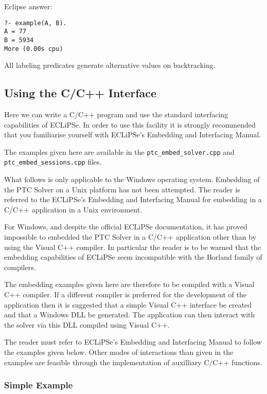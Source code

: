 \documentclass{article}
\begin{document}
Eclipse answer:

\begin{verbatim}
?- example(A, B).
A = 77
B = 5934
More (0.00s cpu)
\end{verbatim}

All labeling predicates generate alternative values on
backtracking.

\subsection{Using the C/C++ Interface}

Here we can write a C/C++ program and use the standard interfacing capabilities
of ECLiPSe.
In order to use this facility it is strongly recommended that you familiarise
yourself
with ECLiPSe's Embedding and Interfacing Manual.

The examples given here are available in the \verb+ptc_embed_solver.cpp+ and
\verb+ptc_embed_sessions.cpp+ files.

What follows is only applicable to the Windows operating system. Embedding of
the PTC Solver on a Unix platform has not been attempted. The reader is referred
to the ECLiPSe's Embedding and Interfacing Manual for embedding in a C/C++
application in a Unix environment.

For Windows, and despite the official ECLiPSe documentation, it has proved
impossible to embedded the PTC Solver in a C/C++ application other than by using
the Visual C++ compiler. In particular the reader is to be warned that the
embedding capabilities of ECLiPSe seem incompatible with the Borland family of
compilers.

The embedding examples given here are therefore to be compiled with a Visual C++
compiler. If a different compiler is preferred for the development of the
application then it is suggested that a simple Visual C++ interface be created
and
that a Windows DLL be generated. The application can then interact with the
solver via this DLL compiled using Visual C++.

The reader must refer to ECLiPSe's Embedding and Interfacing Manual to follow the
examples
given below. Other modes of interactions than given in the examples are feasible
through the implementation of auxilliary C/C++ functions.

\subsubsection{Simple Example}
\end{document}
